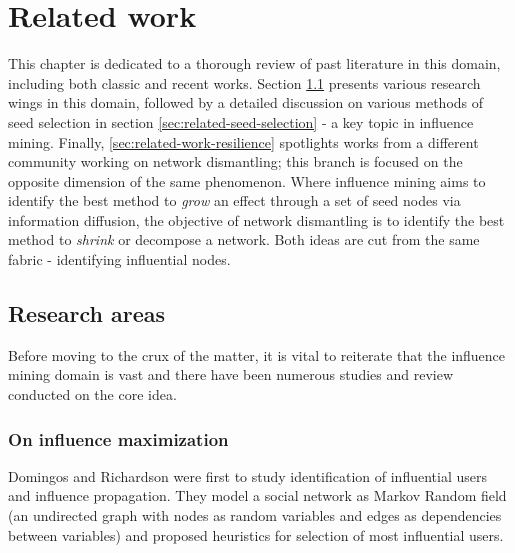 \chapter{Related work}
\label{chp:related-work}

This chapter is dedicated to a thorough review of past literature in this domain, including both classic and recent works. Section \ref{sec:related-work-areas} presents various research wings in this domain, followed by a detailed discussion on various methods of seed selection in section \ref{sec:related-seed-selection} - a key topic in influence mining. Finally, \ref{sec:related-work-resilience} spotlights works from a different community working on network dismantling; this branch is focused on the opposite dimension of the same phenomenon. Where influence mining aims to identify the best method to \textit{grow} an effect through a set of seed nodes via information diffusion, the objective of network dismantling is to identify the best method to \textit{shrink} or decompose a network. Both ideas are cut from the same fabric - identifying influential nodes.


	\section{Research areas}
	\label{sec:related-work-areas}
	Before moving to the crux of the matter, it is vital to reiterate that the influence mining domain is vast and there have been numerous studies and review conducted on the core idea.
		
		\subsection{On influence maximization}
		Domingos and Richardson \cite{domingos2001} were first to study identification of influential users and influence propagation. They model a social network as Markov Random field (an undirected graph with nodes as random variables and edges as dependencies between variables) and proposed heuristics for selection of most influential users.
		

